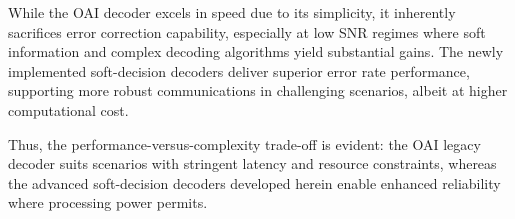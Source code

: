 \documentclass[../main.tex]{subfiles}
\begin{document}
While the OAI decoder excels in speed due to its simplicity, it inherently sacrifices error correction capability, especially at low SNR regimes where soft information and complex decoding algorithms yield substantial gains. The newly implemented soft-decision decoders deliver superior error rate performance, supporting more robust communications in challenging scenarios, albeit at higher computational cost.

Thus, the performance-versus-complexity trade-off is evident: the OAI legacy decoder suits scenarios with stringent latency and resource constraints, whereas the advanced soft-decision decoders developed herein enable enhanced reliability where processing power permits.
\end{document}
